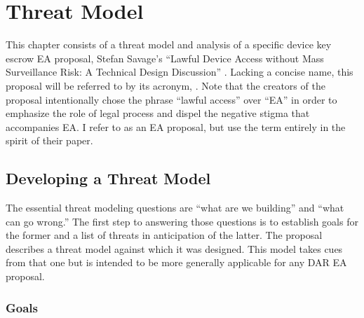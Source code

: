 \chapter{Threat Model}
\label{chap-threatmodel}

This chapter consists of a threat model and analysis of a specific device key escrow \ac{EA} proposal, Stefan Savage's
``Lawful Device Access without Mass Surveillance Risk: A Technical Design Discussion'' \cite{savage_lawful_2018}.
Lacking a concise name, this proposal will be referred to by its acronym, \ldawmsR. Note that the creators of the
proposal intentionally chose the phrase ``lawful access'' over ``\acl{EA}'' in order to emphasize the role of legal
process and dispel the negative stigma that accompanies \ac{EA}. I refer to \ldawmsr as an \ac{EA} proposal, but use the
term entirely in the spirit of their paper.



\section{Developing a Threat Model}

The essential threat modeling questions are ``what are we building'' and ``what can go wrong.'' The first step to
answering those questions is to establish goals for the former and a list of threats in anticipation of the latter. The
\ldawmsr proposal describes a threat model against which it was designed. This model takes cues from that one but is
intended to be more generally applicable for any \ac{DAR} \ac{EA} proposal.

\newcommand{\modelstart}[0]{\begin{itemize}}
\newcommand{\modelitem}[2]{ %
    \item \textbf{#1} \nopagebreak

    \vspace{0.5\baselineskip} \parbox{\linewidth}{#2} \vspace{0.5\baselineskip}
}
\newcommand{\modelend}{\end{itemize}}


\subsection{Goals}

